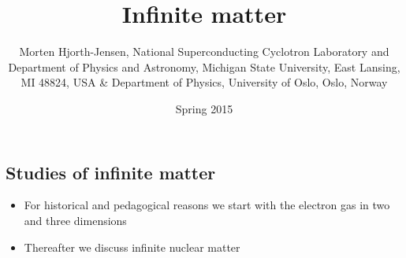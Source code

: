 \documentclass[%
twoside,                 %
final,                   %
10pt]{article}
\begin{document}






\title{Infinite matter}


\author{Morten Hjorth-Jensen, National Superconducting Cyclotron Laboratory and Department of Physics and Astronomy, Michigan State University, East Lansing, MI 48824, USA {\&} Department of Physics, University of Oslo, Oslo, Norway\inst{}}
\institute{}

\date{Spring 2015
}

\subsection{Studies of infinite matter}

\begin{block}{}
\begin{itemize}
\item For historical and pedagogical  reasons we start with the electron gas in two and three dimensions 

\item Thereafter we discuss infinite nuclear matter
\end{itemize}

\noindent
\end{block}



\end{document}
